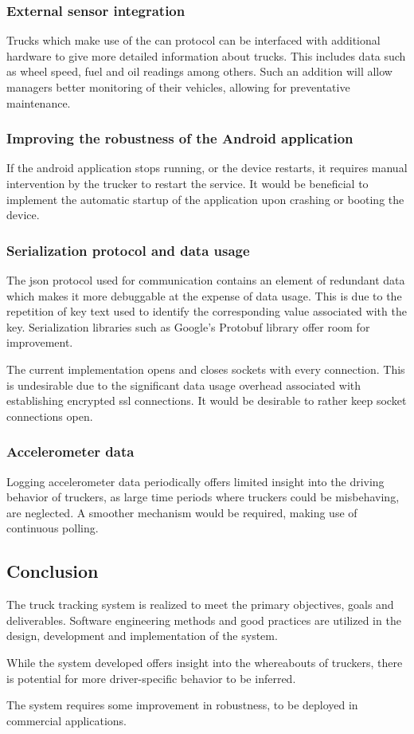 \subsubsection{External sensor integration}
Trucks which make use of the \ac{can} protocol can be interfaced with additional hardware to give more detailed information about trucks.
This includes data such as wheel speed, fuel and oil readings among others.
Such an addition will allow managers better monitoring of their vehicles, allowing for preventative maintenance.

\subsubsection{Improving the robustness of the Android application}
If the android application stops running, or the device restarts, it requires manual intervention by the trucker to restart the service.
It would be beneficial to implement the automatic startup of the application upon crashing or booting the device.

\subsubsection{Serialization protocol and data usage}
The \ac{json} protocol used for communication contains an element of redundant data which makes it more debuggable at the expense of data usage.
This is due to the repetition of key text used to identify the corresponding value associated with the key.
Serialization libraries such as Google's Protobuf library offer room for improvement.

The current implementation opens and closes sockets with every connection.
This is undesirable due to the significant data usage overhead associated with establishing encrypted \ac{ssl} connections.
It would be desirable to rather keep socket connections open.

\subsubsection{Accelerometer data}
Logging accelerometer data periodically offers limited insight into the driving behavior of truckers, as large time periods where truckers could be misbehaving, are neglected.
A smoother mechanism would be required, making use of continuous polling.

\subsection{Conclusion}
The truck tracking system is realized to meet the primary objectives, goals and deliverables.
Software engineering methods and good practices are utilized in the design, development and implementation of the system.

While the system developed offers insight into the whereabouts of truckers, there is potential for more driver-specific behavior to be inferred.

The system requires some improvement in robustness, to be deployed in commercial applications.
